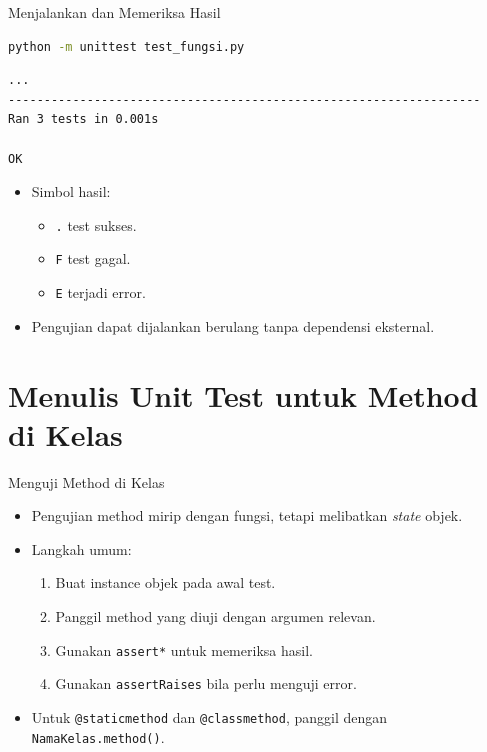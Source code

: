 \documentclass[aspectratio=169, table]{beamer}
\begin{document}
\begin{frame}[fragile]{Menjalankan dan Memeriksa Hasil}
\vspace*{10pt}
\begin{lstlisting}[language=bash]
python -m unittest test_fungsi.py
\end{lstlisting}

\begin{lstlisting}[language=bash]
...
------------------------------------------------------------------
Ran 3 tests in 0.001s

OK
\end{lstlisting}

\begin{itemize}
  \item Simbol hasil:
  \begin{itemize}
    \item \texttt{.} test sukses.
    \item \texttt{F} test gagal.
    \item \texttt{E} terjadi error.
  \end{itemize}
  \item Pengujian dapat dijalankan berulang tanpa dependensi eksternal.
\end{itemize}
\end{frame}

\section{Menulis Unit Test untuk Method di Kelas}

\begin{frame}[fragile]{Menguji Method di Kelas}
\vspace*{10pt}
\begin{itemize}
  \item Pengujian method mirip dengan fungsi, tetapi melibatkan \textit{state} objek.
  \item Langkah umum:
  \begin{enumerate}
    \item Buat instance objek pada awal test.
    \item Panggil method yang diuji dengan argumen relevan.
    \item Gunakan \texttt{assert*} untuk memeriksa hasil.
    \item Gunakan \texttt{assertRaises} bila perlu menguji error.
  \end{enumerate}
  \item Untuk \texttt{@staticmethod} dan \texttt{@classmethod}, panggil dengan \texttt{NamaKelas.method()}.
\end{itemize}
\end{frame}
\end{document}
